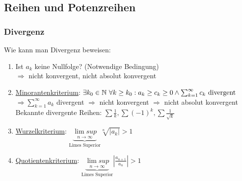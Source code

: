 \subsection{Reihen und Potenzreihen}
\subsubsection{Divergenz}
Wie kann man Divergenz beweisen:
\begin{enumerate}[label=\arabic*)]
    \item Ist $a_k$ keine Nullfolge? (Notwendige Bedingung)\\ 
    $\Rightarrow$ nicht konvergent, nicht absolut konvergent
    \item \underline{Minorantenkriterium}: $\exists k_0 \in \mathbb N \ \forall k \geq k_0: a_k \geq c_k \geq 0 \land \sum_{k=1}^{\infty} c_k \text{ divergent}$\\
    $\Rightarrow \sum_{k=1}^{\infty} a_k$ divergent $\Rightarrow$ nicht konvergent $\Rightarrow$ nicht absolut konvergent\\
    Bekannte divergente Reihen: $\sum \frac{1}{k}, \sum (-1)^k, \sum \frac{1}{\sqrt{k}}$
    \item \underline{Wurzelkriterium}: $\underbrace{\underset{n \rightarrow \infty}{\lim sup}}_{\text{Limes Superior}} \sqrt[n]{|a_k|} > 1$
    \item \underline{Quotientenkriterium}: $\underbrace{\underset{n \rightarrow \infty}{\lim sup}}_{\text{Limes Superior}} \left|\frac{a_{n+1}}{a_n}\right| > 1$
\end{enumerate}

